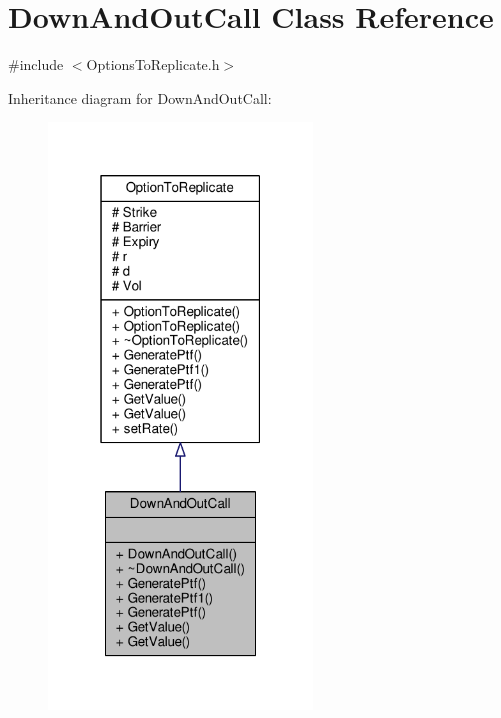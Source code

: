 \hypertarget{classDownAndOutCall}{}\section{Down\+And\+Out\+Call Class Reference}
\label{classDownAndOutCall}


{\ttfamily \#include $<$Options\+To\+Replicate.\+h$>$}



Inheritance diagram for Down\+And\+Out\+Call\+:
\nopagebreak
\begin{figure}[H]
\begin{center}
\leavevmode
\includegraphics[width=199pt]{classDownAndOutCall__inherit__graph}
\end{center}
\end{figure}


